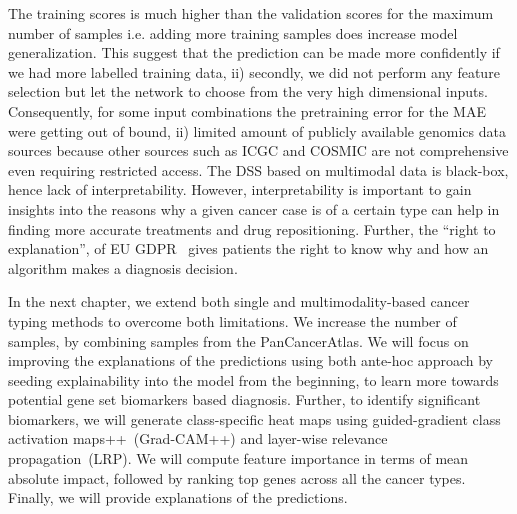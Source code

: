 \hspace*{3.5mm} The training scores is much higher than the validation scores for the maximum number of samples i.e. adding more training samples does increase model generalization. This suggest that the prediction can be made more confidently if we had more labelled training data, ii) secondly, we did not perform any feature selection but let the network to choose from the very high dimensional inputs. Consequently, for some input combinations the pretraining error for the MAE were getting out of bound, ii) limited amount of publicly available genomics data sources because other sources such as ICGC and COSMIC are not comprehensive even requiring restricted access. The DSS based on multimodal data is black-box, hence lack of interpretability. However, interpretability is important to gain insights into the reasons why a given cancer case is of a certain type can help in finding more accurate treatments and drug repositioning. Further, the ``right to explanation'', of EU GDPR~\cite{kaminski2019right} gives patients the right to know why and how an algorithm makes a diagnosis decision. 

\hspace*{3.5mm} In the next chapter, we extend both single and multimodality-based cancer typing methods to overcome both limitations. We increase the number of samples, by combining samples from the PanCancerAtlas. We will focus on improving the explanations of the predictions using both ante-hoc approach by seeding explainability into the model from the beginning, to learn more towards potential gene set biomarkers based diagnosis. Further, to identify significant biomarkers, we will generate class-specific heat maps using guided-gradient class activation maps++~(Grad-CAM++) and layer-wise relevance propagation~(LRP). We will compute feature importance in terms of mean absolute impact, followed by ranking top genes across all the cancer types. Finally, we will provide explanations of the predictions.  
